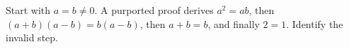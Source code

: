 Start with $a=b\ne0$. A purported proof derives $a^2=ab$, then $(a+b)(a-b)=b(a-b)$, then $a+b=b$, and finally $2=1$. Identify the invalid step.
